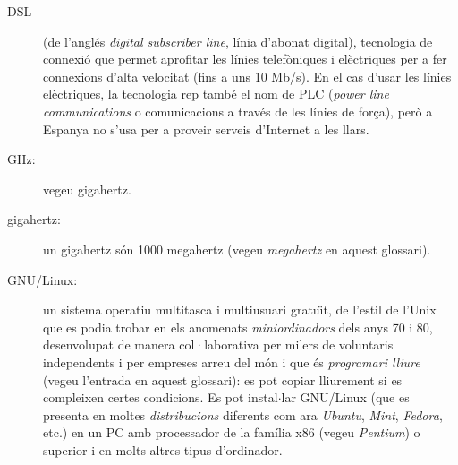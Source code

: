 \begin{description}
  
\item[DSL] (de l'anglés \emph{digital subscriber line}, línia d'abonat
  digital), tecnologia de connexió que permet aprofitar les línies
  telefòniques i elèctriques per a fer connexions d'alta velocitat
  (fins a uns 10 Mb/s). En el cas d'usar les línies elèctriques, la
  tecnologia rep també el nom de PLC (\emph{power line communications}
  o comunicacions a través de les línies de força), però a Espanya no
  s'usa per a proveir serveis d'Internet a les llars.

\item[GHz:] vegeu gigahertz.

\item[gigahertz:] un gigahertz són 1000 megahertz (vegeu
  \emph{megahertz} en aquest glossari).
  
\item[GNU/Linux:] un sistema operatiu multitasca i multiusuari
  gratu\"{\i}t, de l'estil de l'Unix que es podia trobar en els
  anomenats \emph{miniordinadors} dels anys 70 i 80, desenvolupat de
  manera col·laborativa per milers de voluntaris independents i per
  empreses arreu del món i que és \emph{programari lliure} (vegeu
  l'entrada en aquest glossari): es pot copiar lliurement si es
  compleixen certes condicions. Es pot instal$\cdot$lar GNU/Linux (que
  es presenta en moltes \emph{distribucions} diferents com ara
  \emph{Ubuntu}, \emph{Mint}, \emph{Fedora}, etc.) en un PC amb
  processador de la família x86 (vegeu \emph{Pentium}) o superior i en
  molts altres tipus d'ordinador.
  

\end{description}
